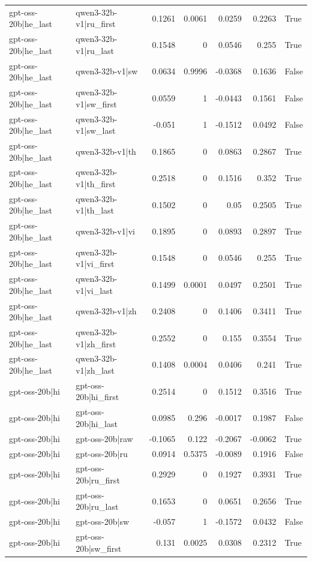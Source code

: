 \begin{table}
\begin{tabular}{l l r r r r l}
gpt-oss-20b|he_last & qwen3-32b-v1|ru_first & 0.1261 & 0.0061 & 0.0259 & 0.2263 & True \\
gpt-oss-20b|he_last & qwen3-32b-v1|ru_last & 0.1548 & 0 & 0.0546 & 0.255 & True \\
gpt-oss-20b|he_last & qwen3-32b-v1|sw & 0.0634 & 0.9996 & -0.0368 & 0.1636 & False \\
gpt-oss-20b|he_last & qwen3-32b-v1|sw_first & 0.0559 & 1 & -0.0443 & 0.1561 & False \\
gpt-oss-20b|he_last & qwen3-32b-v1|sw_last & -0.051 & 1 & -0.1512 & 0.0492 & False \\
gpt-oss-20b|he_last & qwen3-32b-v1|th & 0.1865 & 0 & 0.0863 & 0.2867 & True \\
gpt-oss-20b|he_last & qwen3-32b-v1|th_first & 0.2518 & 0 & 0.1516 & 0.352 & True \\
gpt-oss-20b|he_last & qwen3-32b-v1|th_last & 0.1502 & 0 & 0.05 & 0.2505 & True \\
gpt-oss-20b|he_last & qwen3-32b-v1|vi & 0.1895 & 0 & 0.0893 & 0.2897 & True \\
gpt-oss-20b|he_last & qwen3-32b-v1|vi_first & 0.1548 & 0 & 0.0546 & 0.255 & True \\
gpt-oss-20b|he_last & qwen3-32b-v1|vi_last & 0.1499 & 0.0001 & 0.0497 & 0.2501 & True \\
gpt-oss-20b|he_last & qwen3-32b-v1|zh & 0.2408 & 0 & 0.1406 & 0.3411 & True \\
gpt-oss-20b|he_last & qwen3-32b-v1|zh_first & 0.2552 & 0 & 0.155 & 0.3554 & True \\
gpt-oss-20b|he_last & qwen3-32b-v1|zh_last & 0.1408 & 0.0004 & 0.0406 & 0.241 & True \\
gpt-oss-20b|hi & gpt-oss-20b|hi_first & 0.2514 & 0 & 0.1512 & 0.3516 & True \\
gpt-oss-20b|hi & gpt-oss-20b|hi_last & 0.0985 & 0.296 & -0.0017 & 0.1987 & False \\
gpt-oss-20b|hi & gpt-oss-20b|raw & -0.1065 & 0.122 & -0.2067 & -0.0062 & True \\
gpt-oss-20b|hi & gpt-oss-20b|ru & 0.0914 & 0.5375 & -0.0089 & 0.1916 & False \\
gpt-oss-20b|hi & gpt-oss-20b|ru_first & 0.2929 & 0 & 0.1927 & 0.3931 & True \\
gpt-oss-20b|hi & gpt-oss-20b|ru_last & 0.1653 & 0 & 0.0651 & 0.2656 & True \\
gpt-oss-20b|hi & gpt-oss-20b|sw & -0.057 & 1 & -0.1572 & 0.0432 & False \\
gpt-oss-20b|hi & gpt-oss-20b|sw_first & 0.131 & 0.0025 & 0.0308 & 0.2312 & True \\

\end{tabular}
\end{table}
